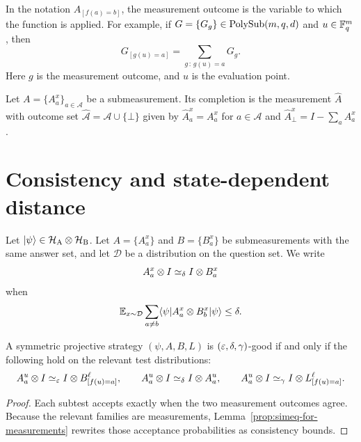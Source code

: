 \begin{remark}\label{rem:post-processing-notation}
	In the notation $A_{[f(a)=b]}$, the measurement outcome is the variable to which
	the function is applied. For example, if $G=\{G_g\} \in \mathrm{PolySub}(m,q,d)$ and
	$u \in \mathbb{F}_q^m$, then
	\[
		G_{[g(u)=a]} = \sum_{g\,:\,g(u)=a} G_g.
	\]
	Here $g$ is the measurement outcome, and $u$ is the evaluation point.
\end{remark}

\begin{definition}\label{def:measurement-completion}
	\leanok
	Let $A=\{A_a^x\}_{a \in \mathcal A}$ be a submeasurement. Its completion is the measurement $\widehat A$ with outcome set $\widehat{\mathcal A}=\mathcal A \cup \{\bot\}$ given by $\widehat A_a^x=A_a^x$ for $a \in \mathcal A$ and $\widehat A_\bot^x = I-\sum_a A_a^x$.
\end{definition}

\section{Consistency and state-dependent distance}
\label{sec:comparing-measurements}


\begin{definition}[Consistency]\label{def:simeq}
	\leanok
	Let $\lvert \psi \rangle \in \mathcal H_{\mathrm A} \otimes \mathcal H_{\mathrm B}$. Let $A=\{A_a^x\}$ and $B=\{B_a^x\}$ be submeasurements with the same answer set, and let $\mathcal D$ be a distribution on the question set. We write
	\[
		A_a^x \otimes I \simeq_\delta I \otimes B_a^x
	\]
	when
	\begin{equation}\label{eq:no-big-Oh}
		\mathbb{E}_{x \sim \mathcal D} \sum_{a \ne b} \langle \psi \rvert A_a^x \otimes B_b^x \lvert \psi \rangle \le \delta.
	\end{equation}
\end{definition}

\begin{lemma}\label{lem:good-strategy-characterization}
	\leanok
	A symmetric projective strategy $(\psi,A,B,L)$ is $(\varepsilon,\delta,\gamma)$-good if and only if the following hold on the relevant test distributions:
	\[
		A_a^u \otimes I \simeq_\varepsilon I \otimes B^{\ell}_{[f(u)=a]},
		\qquad
		A_a^u \otimes I \simeq_\delta I \otimes A_a^u,
		\qquad
		A_a^u \otimes I \simeq_\gamma I \otimes L^{\ell}_{[f(u)=a]}.
	\]
\end{lemma}
\begin{proof}
	\leanok
	Each subtest accepts exactly when the two measurement outcomes agree. Because the relevant families are measurements, Lemma~\ref{prop:simeq-for-measurements} rewrites those acceptance probabilities as consistency bounds.
\end{proof}

